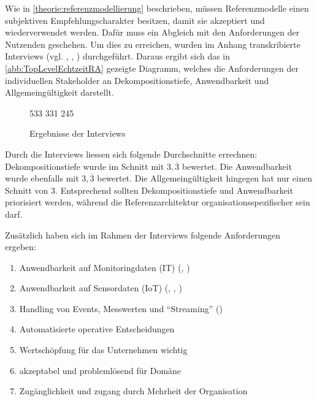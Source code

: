 Wie in \autoref{theorie:referenzmodellierung} beschrieben, müssen Referenzmodelle einen subjektiven Empfehlungscharakter besitzen, damit sie akzeptiert und wiederverwendet werden. Dafür muss ein Abgleich mit den Anforderungen der Nutzenden geschehen. Um dies zu erreichen, wurden im Anhang transkribierte Interviews (vgl. , , ) durchgeführt. Daraus ergibt sich das in \autoref{abb:TopLevelEchtzeitRA} gezeigte Diagramm, welches die Anforderungen der individuellen Stakeholder an Dekompositionstiefe, Anwendbarkeit und Allgemeingültigkeit darstellt.

\begin{figure}[H]
\centering
\spideroverview
{5}{3}{3}
{3}{3}{1}
{2}{4}{5}
\caption{Ergebnisse der Interviews}
\label{abb:DimensionenUebersicht}
\end{figure}
Durch die Interviews liessen sich folgende Durchschnitte errechnen: Dekompositionstiefe wurde im Schnitt mit $3,\overline{3}$ bewertet. Die Anwendbarkeit wurde ebenfalls mit $3,\overline{3}$ bewertet. Die Allgemeingültigkeit hingegen hat nur einen Schnitt von $3$. Entsprechend sollten Dekompositionstiefe und Anwendbarkeit priorisiert werden, während die Referenzarchitektur organisationsspezifischer sein darf. 

Zusätzlich haben sich im Rahmen der Interviews folgende Anforderungen ergeben:
\begin{enumerate}
\item Anwendbarkeit auf Monitoringdaten (IT) (, )
\item Anwendbarkeit auf Sensordaten (\ac{IoT}) (, , )
\item Handling von Events, Messwerten und \enquote{Streaming} ()
\item Automatisierte operative Entscheidungen
\item \label{anforderung:wertschöpfung} Wertschöpfung für das Unternehmen wichtig
\item \label{anforderung:akzeptabel} akzeptabel und problemlösend für Domäne
\item \label{anforderung:zugänglichkeit} Zugänglichkeit und zugang durch Mehrheit der Organisation
\end{enumerate}

